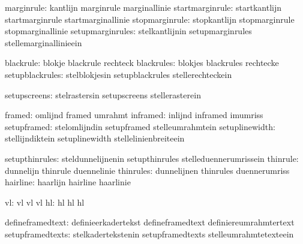                    marginrule:  kantlijn                     marginrule
                                marginallinie
              startmarginrule:  startkantlijn                startmarginrule
                                startmarginallinie
               stopmarginrule:  stopkantlijn                 stopmarginrule
                                stopmarginallinie
             setupmarginrules:  stelkantlijnin               setupmarginrules
                                stellemarginallinieein

                    blackrule:  blokje                       blackrule
                                rechteck
                   blackrules:  blokjes                      blackrules
                                rechtecke
              setupblackrules:  stelblokjesin                setupblackrules
                                stellerechteckein

                 setupscreens:  stelrastersin                setupscreens
                                stellerasterein

                       framed:  omlijnd                      framed
                                umrahmt
                     inframed:  inlijnd                      inframed
                                imumriss
                  setupframed:  stelomlijndin                setupframed
                                stelleumrahmtein
               setuplinewidth:  stellijndiktein              setuplinewidth
                                stellelinienbreiteein

               setupthinrules:  steldunnelijnenin            setupthinrules
                                stelleduennerumrissein
                     thinrule:  dunnelijn                    thinrule
                                duennelinie
                    thinrules:  dunnelijnen                  thinrules
                                duennerumriss
                     hairline:  haarlijn                     hairline
                                haarlinie

                           vl:  vl                           vl
                                vl
                           hl:  hl                           hl
                                hl

             defineframedtext:  definieerkadertekst          defineframedtext
                                definiereumrahmtertext
             setupframedtexts:  stelkadertekstenin           setupframedtexts
                                stelleumrahmtetexteein

